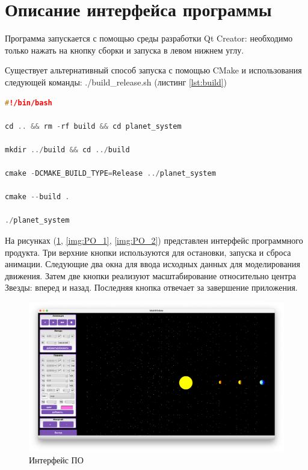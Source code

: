    \section{Описание интерфейса программы}
    \par Программа запускается с помощью среды разработки Qt Creator: необходимо только нажать на кнопку сборки и запуска в левом нижнем углу.
    \par Существует альтернативный способ запуска с помощью CMake и использования следующей команды: ./build\_release.sh (листинг \ref{lst:build})
    \begin{lstlisting}[language=C++, label=lst:build, caption=Release сборка программы для терминала]
#!/bin/bash

cd .. && rm -rf build && cd planet_system

mkdir ../build && cd ../build

cmake -DCMAKE_BUILD_TYPE=Release ../planet_system

cmake --build .

./planet_system
    \end{lstlisting}
    \par На рисунках (\ref{img:PO}, \ref{img:PO_1}, \ref{img:PO_2}) представлен интерфейс программного продукта. Три верхние кнопки используются для остановки, запуска и сброса анимации. Следующие два окна для ввода исходных данных для моделирования движения. Затем две кнопки реализуют масштабирование относительно центра Звезды: вперед и назад. Последняя кнопка отвечает за завершение приложения.

    \begin{figure}[h!]
            \centering
            \includegraphics[scale=0.35]{inc/PO.png}
            \caption{Интерфейс ПО}
            \label{img:PO}
    \end{figure}\clearpage

